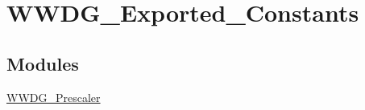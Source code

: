 \hypertarget{group__WWDG__Exported__Constants}{
\section{WWDG\_\-Exported\_\-Constants}
\label{group__WWDG__Exported__Constants}
}
\subsection*{Modules}
\begin{DoxyCompactItemize}
\item 
\hyperlink{group__WWDG__Prescaler}{WWDG\_\-Prescaler}
\end{DoxyCompactItemize}
